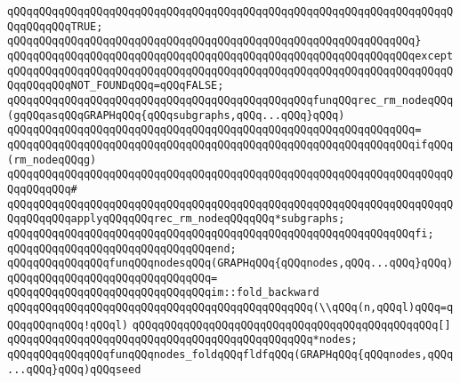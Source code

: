 \verb|qQQqqQQqqQQqqQQqqQQqqQQqqQQqqQQqqQQqqQQqqQQqqQQqqQQqqQQqqQQqqQQqqQQqqQQqqQQqqQQqTRUE;|\newline
\verb|qQQqqQQqqQQqqQQqqQQqqQQqqQQqqQQqqQQqqQQqqQQqqQQqqQQqqQQqqQQqqQQq}|\newline
\verb|qQQqqQQqqQQqqQQqqQQqqQQqqQQqqQQqqQQqqQQqqQQqqQQqqQQqqQQqqQQqqQQqexcept|\newline
\verb|qQQqqQQqqQQqqQQqqQQqqQQqqQQqqQQqqQQqqQQqqQQqqQQqqQQqqQQqqQQqqQQqqQQqqQQqqQQqqQQqNOT_FOUNDqQQq=qQQqFALSE;|\newline
\newline
\newline
\verb|qQQqqQQqqQQqqQQqqQQqqQQqqQQqqQQqqQQqqQQqqQQqqQQqfunqQQqrec_rm_nodeqQQq(gqQQqasqQQqGRAPHqQQq{qQQqsubgraphs,qQQq...qQQq}qQQq)|\newline
\verb|qQQqqQQqqQQqqQQqqQQqqQQqqQQqqQQqqQQqqQQqqQQqqQQqqQQqqQQqqQQqqQQq=|\newline
\verb|qQQqqQQqqQQqqQQqqQQqqQQqqQQqqQQqqQQqqQQqqQQqqQQqqQQqqQQqqQQqqQQqifqQQq(rm_nodeqQQqg)|\newline
\verb|qQQqqQQqqQQqqQQqqQQqqQQqqQQqqQQqqQQqqQQqqQQqqQQqqQQqqQQqqQQqqQQqqQQqqQQqqQQqqQQq#|\newline
\verb|qQQqqQQqqQQqqQQqqQQqqQQqqQQqqQQqqQQqqQQqqQQqqQQqqQQqqQQqqQQqqQQqqQQqqQQqqQQqqQQqapplyqQQqqQQqrec_rm_nodeqQQqqQQq*subgraphs;|\newline
\verb|qQQqqQQqqQQqqQQqqQQqqQQqqQQqqQQqqQQqqQQqqQQqqQQqqQQqqQQqqQQqqQQqfi;|\newline
\verb|qQQqqQQqqQQqqQQqqQQqqQQqqQQqqQQqend;|\newline
\newline
\newline
\verb|qQQqqQQqqQQqqQQqfunqQQqnodesqQQq(GRAPHqQQq{qQQqnodes,qQQq...qQQq}qQQq)|\newline
\verb|qQQqqQQqqQQqqQQqqQQqqQQqqQQqqQQq=|\newline
\verb|qQQqqQQqqQQqqQQqqQQqqQQqqQQqqQQqim::fold_backward|\newline
\verb|qQQqqQQqqQQqqQQqqQQqqQQqqQQqqQQqqQQqqQQqqQQqqQQq(\\qQQq(n,qQQql)qQQq=qQQqqQQqnqQQq!qQQql)|\newline
\verb|qQQqqQQqqQQqqQQqqQQqqQQqqQQqqQQqqQQqqQQqqQQqqQQq[]|\newline
\verb|qQQqqQQqqQQqqQQqqQQqqQQqqQQqqQQqqQQqqQQqqQQqqQQq*nodes;|\newline
\newline
\newline
\verb|qQQqqQQqqQQqqQQqfunqQQqnodes_foldqQQqfldfqQQq(GRAPHqQQq{qQQqnodes,qQQq...qQQq}qQQq)qQQqseed|\newline
